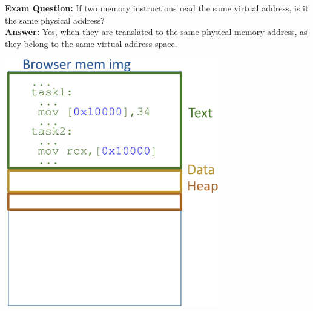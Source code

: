 \noindent
\begin{minipage}{0.45\textwidth}
\textbf{Exam Question:} If two memory instructions read the same virtual address, is it the same physical address? \\[3px]
\textbf{Answer:} Yes, when they are translated to the same physical memory address, as they belong to the same virtual address space.
\end{minipage}%
\hfill
\vline
\hfill
\begin{minipage}{0.45\textwidth}
\begin{center}
    \includegraphics[width=0.7\textwidth]{chapters/L4/images/two-proc.png}
\end{center}
\end{minipage}
\\[10px]

